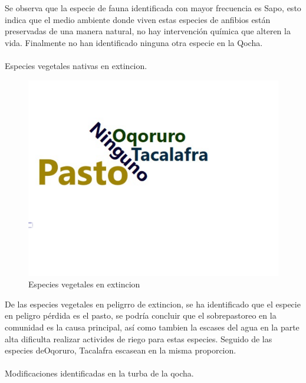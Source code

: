 \documentclass[12pt]{article}\usepackage[]{graphicx}\usepackage[]{xcolor}
\makeatletter
\def\maxwidth{ %
  \ifdim\Gin@nat@width>\linewidth
    \linewidth
  \else
    \Gin@nat@width
  \fi
}
\newenvironment{knitrout}{}{} %
\makeatother
\begin{document}
	Se observa que la especie de fauna identificada con mayor frecuencia es Sapo, esto indica que el medio ambiente donde viven estas especies de anfibios están preservadas de una manera natural, no hay intervención química que alteren la vida. Finalmente no han identificado ninguna otra especie en la Qocha.\\
	\\
	Especies vegetales nativas en extincion.
	\begin{figure}[H]
	\centering
\begin{knitrout}
\color{fgcolor}
\includegraphics[width=\maxwidth]{figure/treintaytres-1} 
\end{knitrout}
	\caption{Especies vegetales en extincion}
	\end{figure}
	De las especies vegetales en peligrro de extincion, se ha identificado que el especie en peligro pérdida es el pasto, se podría concluir que el sobrepastoreo en la comunidad es la causa principal, así como tambien la escases del agua en la parte alta dificulta realizar activides de riego para estas especies. Seguido de las especies deOqoruro, Tacalafra escasean en la misma proporcion.\\
	\\
	Modificaciones identificadas en la turba de la qocha.
\end{document}

